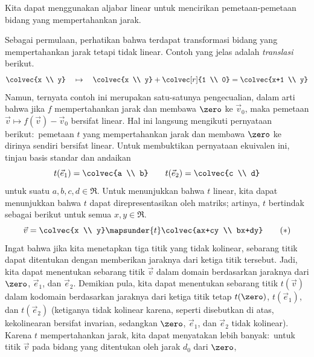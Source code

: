 Kita dapat menggunakan aljabar linear untuk mencirikan pemetaan-pemetaan bidang
yang mempertahankan jarak.

Sebagai permulaan, perhatikan bahwa terdapat transformasi bidang yang
mempertahankan jarak tetapi tidak linear.
Contoh yang jelas adalah \emph{translasi} berikut.
\begin{equation*}
  \colvec{x \\ y}
  \quad\mapsto\quad
  \colvec{x \\ y}+\colvec[r]{1 \\ 0}=\colvec{x+1 \\ y}
\end{equation*}
Namun, ternyata contoh ini merupakan satu-satunya pengecualian, dalam arti
bahwa jika $f$ mempertahankan jarak dan membawa $\zero$ ke $\vec{v}_0$, maka
pemetaan $\vec{v}\mapsto f(\vec{v})-\vec{v}_0$ bersifat linear.
Hal ini langsung mengikuti pernyataan berikut:~pemetaan $t$ yang
mempertahankan jarak dan membawa $\zero$ ke dirinya sendiri bersifat linear.
Untuk membuktikan pernyataan ekuivalen ini, tinjau basis standar dan andaikan
\begin{equation*}
  t(\vec{e}_1)=\colvec{a \\ b}
  \qquad
  t(\vec{e}_2)=\colvec{c \\ d}
\end{equation*}
untuk suatu $a,b,c,d\in\Re$.
Untuk menunjukkan bahwa $t$ linear, kita dapat menunjukkan bahwa $t$ dapat
direpresentasikan oleh matriks; artinya, $t$ bertindak sebagai berikut untuk
semua $x,y\in\Re$.
\begin{equation*}
  \vec{v}=\colvec{x  \\  y}
  \mapsunder{t}
  \colvec{ax+cy  \\  bx+dy}
\tag*{\text{($*$)}}\end{equation*}
Ingat bahwa jika kita menetapkan tiga titik yang tidak kolinear, sebarang titik
dapat ditentukan dengan memberikan jaraknya dari ketiga titik tersebut.
Jadi, kita dapat menentukan sebarang titik $\vec{v}$ dalam domain berdasarkan
jaraknya dari $\zero$, $\vec{e}_1$, dan $\vec{e}_2$.
Demikian pula, kita dapat menentukan sebarang titik $t(\vec{v})$ dalam
kodomain berdasarkan jaraknya dari ketiga titik tetap $t(\zero)$,
$t(\vec{e}_1)$, dan $t(\vec{e}_2)$ (ketiganya tidak kolinear karena, seperti
disebutkan di atas, kekolinearan bersifat invarian, sedangkan $\zero$,
$\vec{e}_1$, dan $\vec{e}_2$ tidak kolinear).
Karena $t$ mempertahankan jarak, kita dapat menyatakan lebih banyak:~untuk
titik $\vec{v}$ pada bidang yang ditentukan oleh jarak $d_0$ dari $\zero$,
